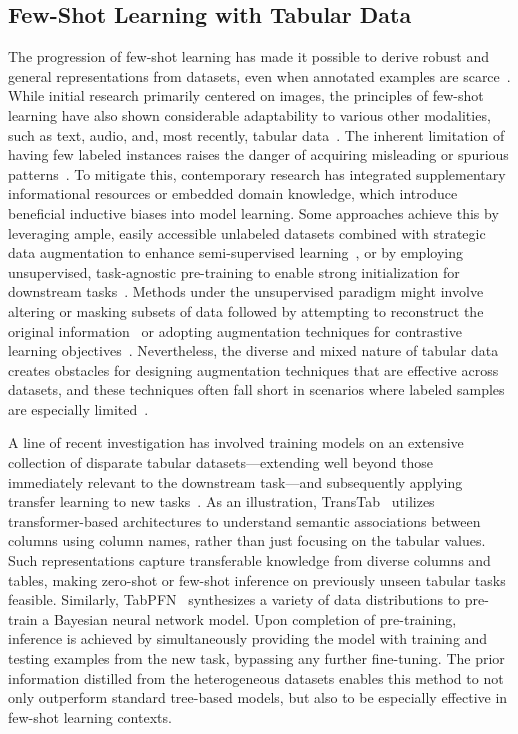 \subsection{Few-Shot Learning with Tabular Data} The progression of few-shot learning has made it possible to derive robust and general representations from datasets, even when annotated examples are scarce~\cite{chen2018closer}. While initial research primarily centered on images, the principles of few-shot learning have also shown considerable adaptability to various other modalities, such as text, audio, and, most recently, tabular data~\cite{majumder2022few,nam2023stunt,schick2021exploiting}. The inherent limitation of having few labeled instances raises the danger of acquiring misleading or spurious patterns~\cite{bartlett2021deep}. To mitigate this, contemporary research has integrated supplementary informational resources or embedded domain knowledge, which introduce beneficial inductive biases into model learning. Some approaches achieve this by leveraging ample, easily accessible unlabeled datasets combined with strategic data augmentation to enhance semi-supervised learning~\cite{ucar2021subtab,yoon2020vime}, or by employing unsupervised, task-agnostic pre-training to enable strong initialization for downstream tasks~\cite{somepalli2021saint}. Methods under the unsupervised paradigm might involve altering or masking subsets of data followed by attempting to reconstruct the original information~\cite{arik2021tabnet,majmundar2022met} or adopting augmentation techniques for contrastive learning objectives~\cite{bahri2022scarf,chen2020simple}. Nevertheless, the diverse and mixed nature of tabular data creates obstacles for designing augmentation techniques that are effective across datasets, and these techniques often fall short in scenarios where labeled samples are especially limited~\cite{nam2023stunt}.

A line of recent investigation has involved training models on an extensive collection of disparate tabular datasets—extending well beyond those immediately relevant to the downstream task—and subsequently applying transfer learning to new tasks~\cite{zhang2023generative,levin2022transfer,zhu2023xtab}. As an illustration, TransTab~\cite{wang2022transtab} utilizes transformer-based architectures to understand semantic associations between columns using column names, rather than just focusing on the tabular values. Such representations capture transferable knowledge from diverse columns and tables, making zero-shot or few-shot inference on previously unseen tabular tasks feasible. Similarly, TabPFN~\cite{hollmann2022tabpfn} synthesizes a variety of data distributions to pre-train a Bayesian neural network model. Upon completion of pre-training, inference is achieved by simultaneously providing the model with training and testing examples from the new task, bypassing any further fine-tuning. The prior information distilled from the heterogeneous datasets enables this method to not only outperform standard tree-based models, but also to be especially effective in few-shot learning contexts.

